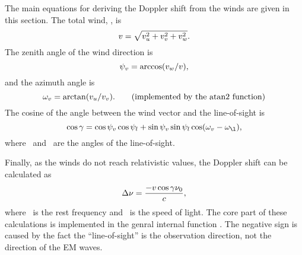 The main equations for deriving the Doppler shift from the winds are given in
this section. The total wind, \Wind, is
\begin{equation}
  v = \sqrt{v_u^2+v_v^2+v_w^2}.
  \label{eq:winds:total}
\end{equation}
The zenith angle of the wind direction is 
\begin{equation}
  \psi_{v} = \arccos(v_w/v),
  \label{eq:winds:za}
\end{equation}
and the azimuth angle is 
\begin{equation}
  \aAzmAng{\Wind} = \arctan(\WindWE/\WindSN). \qquad 
                           \mathrm{(implemented\ by\ the\ atan2\ function)}
  \label{eq:winds:aa}
\end{equation}
The cosine of the angle between the wind vector and the line-of-sight is
\begin{equation}
  \cos\gamma = \cos\aZntAng{\Wind}\cos\aZntAng{l} + 
               \sin\aZntAng{\Wind}\sin\aZntAng{l}
               \cos(\aAzmAng{\Wind}-\aAzmAng{\l}),
  \label{eq:winds:dang}
\end{equation}
where \ and \ are the angles of the line-of-sight. 

Finally, as the winds do not reach relativistic values, the Doppler shift can
be calculated as
\begin{equation}
  \Delta\nu = \frac{-v\cos\gamma\nu_{0}}{c},
\end{equation}
where \ is the rest frequency and \speedoflight\ is the speed of light.
The core part of these calculations is implemented in the genral internal
function . The negative sign 
is caused by the fact the ``line-of-sight'' is the observation direction, not
the direction of the EM waves.




